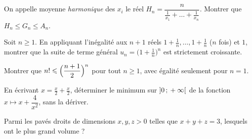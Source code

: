 \begin{exoEval}[Applications]{}{}
\begin{questions}[start=7]
  \item On appelle moyenne \emph{harmonique} des $x_i$ le réel
    $H_n=\dfrac{n}{\frac{1}{x_1}+\dots+\frac{1}{x_n}}$. Montrer que
    $H_n\leqslant G_n\leqslant A_n$.
  \item Soit $n\geqslant1$. En appliquant l'inégalité aux $n+1$ réels
    $1+\frac1n,\dots,1+\frac1n$ ($n$ fois) et $1$, montrer que la suite de
    terme général $u_n=\bigl(1+\frac1n\bigr)^{n}$ est strictement
    croissante.
  \item Montrer que $n!\leqslant\Bigl(\dfrac{n+1}{2}\Bigr)^{n}$ pour tout
    $n\geqslant1$, avec égalité seulement pour $n=1$.
  \item En écrivant $x=\frac x2+\frac x2$, déterminer le minimum sur
    $\mathopen{]}0\,{;}\,+\infty\mathclose{[}$ de la fonction $x\mapsto x+\dfrac{4}{x^{2}}$, sans
    la dériver.
  \item Parmi les pavés droits de dimensions $x,y,z>0$ telles que
    $x+y+z=3$, lesquels ont le plus grand volume ?
\end{questions}
\end{exoEval}
